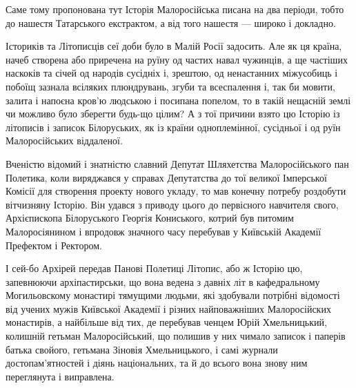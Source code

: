 Саме тому пропонована тут Історія Малоросійська писана на два періоди, тобто до
нашестя Татарського екстрактом, а від того нашестя — широко і докладно.

Істориків та Літописців сеї доби було в Малій Росії задосить. Але як ця країна,
начеб створена або приречена на руїну од частих навал чужинців, а ще частіших
наскоків та січей од народів сусідніх і, зрештою, од ненастанних міжусобиць і
побоїщ зазнала всіляких плюндрувань, згуби та всеспалення і, так би мовити,
залита і напоєна кров'ю людською і посипана попелом, то в такій нещасній землі
чи можливо було зберегти будь-що цілим? А з тої причини взято цю Історію із
літописів і записок Білоруських, як із країни одноплемінної, сусідньої і од
руїн Малоросійських віддаленої.

Вченістю відомий і знатністю славний Депутат Шляхетства Малоросійського пан
Полетика, коли виряджався у справах Депутатства до тої великої Імперської
Комісії для створення проекту нового укладу, то мав конечну потребу роздобути
вітчизняну Історію. Він удався з приводу цього до первісного навчителя свого,
Архієпископа Білоруського Георгія Кониського, котрий був питомим Малоросіянином
і впродовж значного часу перебував у Київській Академії Префектом і Ректором.

І сей-бо Архірей передав Панові Полетиці Літопис, або ж Історію цю, запевнюючи
архіпастирськи, що вона ведена з давніх літ в кафедральному Могильовскому
монастирі тямущими людьми, які здобували потрібні відомості від учених мужів
Київської Академії і різних найповажніших Малоросійских монастирів, а найбільше
від тих, де перебував ченцем Юрій Хмельницький, колишній гетьман
Малоросійський, що полишив у них чимало записок і паперів батька свойого,
гетьмана Зіновія Хмельницького, і самі журнали достопам'ятностей і діянь
національних, та й до всього вона знову ним переглянута і виправлена.

